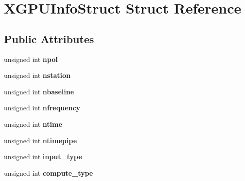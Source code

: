 \hypertarget{struct_x_g_p_u_info_struct}{}\section{X\+G\+P\+U\+Info\+Struct Struct Reference}
\label{struct_x_g_p_u_info_struct}
\subsection*{Public Attributes}
\begin{DoxyCompactItemize}
\item 
unsigned int {\bfseries npol}\hypertarget{struct_x_g_p_u_info_struct_aa6f14548d5401cfd46093e9969db7ffc}{}\label{struct_x_g_p_u_info_struct_aa6f14548d5401cfd46093e9969db7ffc}

\item 
unsigned int {\bfseries nstation}\hypertarget{struct_x_g_p_u_info_struct_ac1b4c810dae5ccad1c900683c55537ee}{}\label{struct_x_g_p_u_info_struct_ac1b4c810dae5ccad1c900683c55537ee}

\item 
unsigned int {\bfseries nbaseline}\hypertarget{struct_x_g_p_u_info_struct_a33158f65e26b9e14a4adf78a95a0c616}{}\label{struct_x_g_p_u_info_struct_a33158f65e26b9e14a4adf78a95a0c616}

\item 
unsigned int {\bfseries nfrequency}\hypertarget{struct_x_g_p_u_info_struct_a35d5bd2370cb5496325f74161027252a}{}\label{struct_x_g_p_u_info_struct_a35d5bd2370cb5496325f74161027252a}

\item 
unsigned int {\bfseries ntime}\hypertarget{struct_x_g_p_u_info_struct_acb7bb5e132d50d325c7c69404acc175d}{}\label{struct_x_g_p_u_info_struct_acb7bb5e132d50d325c7c69404acc175d}

\item 
unsigned int {\bfseries ntimepipe}\hypertarget{struct_x_g_p_u_info_struct_a0f60ea2ff8a6fcf32e026211c97fd419}{}\label{struct_x_g_p_u_info_struct_a0f60ea2ff8a6fcf32e026211c97fd419}

\item 
unsigned int {\bfseries input\+\_\+type}\hypertarget{struct_x_g_p_u_info_struct_a007265b87be6d76c0df34a3245e078d6}{}\label{struct_x_g_p_u_info_struct_a007265b87be6d76c0df34a3245e078d6}

\item 
unsigned int {\bfseries compute\+\_\+type}\hypertarget{struct_x_g_p_u_info_struct_ab7513f514a63d056501c1cd0c52db69a}{}\label{struct_x_g_p_u_info_struct_ab7513f514a63d056501c1cd0c52db69a}


\end{DoxyCompactItemize}
